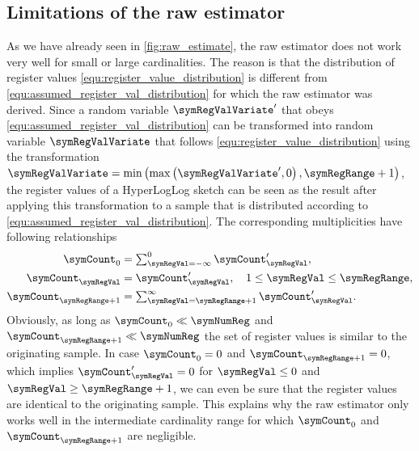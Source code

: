 \documentclass[a4paper]{scrartcl}
\begin{document}
\subsection{Limitations of the raw estimator}
As we have already seen in \cref{fig:raw_estimate}, the raw estimator does not work very well for small or large cardinalities. The reason is that the distribution of register values \eqref{equ:register_value_distribution} is different from \eqref{equ:assumed_register_val_distribution} for which the raw estimator was derived. Since a random variable $\symRegValVariate'$ that obeys \eqref{equ:assumed_register_val_distribution} can be transformed into random variable $\symRegValVariate$ that follows \eqref{equ:register_value_distribution} using the transformation $\symRegValVariate = \min\left(\max\left(\symRegValVariate', 0\right), \symRegRange+1\right)$, the register values of a HyperLogLog sketch can be seen as the result after applying this transformation to a sample that is distributed according to \eqref{equ:assumed_register_val_distribution}. The corresponding multiplicities have  following relationships
\begin{equation}
\label{equ:multiplicity_transformation}
\begin{aligned}
\symCount_0 &= \textstyle\sum_{\symRegVal = -\infty}^{0} \symCount'_\symRegVal, \\
\symCount_\symRegVal &=  \symCount'_\symRegVal, \quad 1\leq\symRegVal\leq\symRegRange,\\
\symCount_{\symRegRange+1} &= \textstyle\sum_{\symRegVal = \symRegRange + 1}^{\infty} \symCount'_\symRegVal.
\end{aligned}
\end{equation}
Obviously, as long as $\symCount_0\ll\symNumReg$ and  $\symCount_{\symRegRange+1}\ll\symNumReg$ the set of register values is similar to the originating sample. In case $\symCount_0=0$ and $\symCount_{\symRegRange+1}=0$, which implies $\symCount'_\symRegVal=0$ for $\symRegVal\leq0$ and $\symRegVal\geq\symRegRange+1$, we can even be sure that the register values are identical to the originating sample. This explains why the raw estimator only works well in the intermediate cardinality range for which $\symCount_0$ and $\symCount_{\symRegRange+1}$ are negligible.
\end{document}
